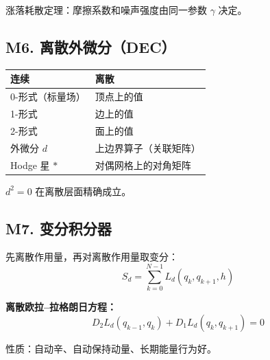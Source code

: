 涨落耗散定理：摩擦系数和噪声强度由同一参数 $\gamma$ 决定。

\subsection{M6. 离散外微分（DEC）}

\begin{center}
\begin{tabular}{ll}
\toprule
\textbf{连续} & \textbf{离散} \\
\midrule
0-形式（标量场） & 顶点上的值 \\
1-形式 & 边上的值 \\
2-形式 & 面上的值 \\
外微分 $d$ & 上边界算子（关联矩阵） \\
Hodge 星 $*$ & 对偶网格上的对角矩阵 \\
\bottomrule
\end{tabular}
\end{center}

$d^2 = 0$ 在离散层面精确成立。

\subsection{M7. 变分积分器}

先离散作用量，再对离散作用量取变分：
\[
S_d = \sum_{k=0}^{N-1} L_d(q_k, q_{k+1}, h)
\]

\textbf{离散欧拉--拉格朗日方程：}
\[
D_2 L_d(q_{k-1}, q_k) + D_1 L_d(q_k, q_{k+1}) = 0
\]

性质：自动辛、自动保持动量、长期能量行为好。